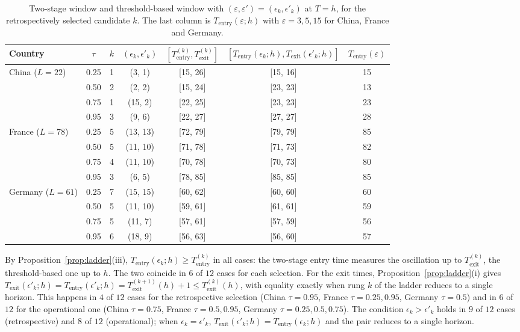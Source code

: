 \documentclass[12pt,a4paper]{article}
\begin{document}
\begin{table}[htbp]
	\centering
	\small
	\caption{Two-stage window and threshold-based window with
		$(\varepsilon,\varepsilon')=(\epsilon_k,\epsilon'_k)$ at $T=h$, for
		the retrospectively selected candidate $k$. The last column is 
		$T_{\mathrm{entry}}(\varepsilon; h)$ with
		$\varepsilon=3,5,15$ for China, France and Germany.}
	\label{tab:tentry_eps_retro}
	\begin{tabular}{lccccc c}
		\toprule
		Country & $\tau$ & $k$ & $(\epsilon_k,\epsilon'_k)$
		& $[T_{\mathrm{entry}}^{(k)},T_{\mathrm{exit}}^{(k)}]$
		& $[T_{\mathrm{entry}}(\epsilon_k;h),T_{\mathrm{exit}}(\epsilon'_k;h)]$
		& $T_{\mathrm{entry}}(\varepsilon)$ \\
		\midrule
		China ($L=22$)    & 0.25 & 1 & (3, 1)   & [15, 26] & [15, 16] & 15 \\
		& 0.50 & 2 & (2, 2)   & [15, 24] & [23, 23] & 13 \\
		& 0.75 & 1 & (15, 2)  & [22, 25] & [23, 23] & 23 \\
		& 0.95 & 3 & (9, 6)   & [22, 27] & [27, 27] & 28 \\
		\midrule
		France ($L=78$)   & 0.25 & 5 & (13, 13) & [72, 79] & [79, 79] & 85 \\
		& 0.50 & 5 & (11, 10) & [71, 78] & [71, 73] & 82 \\
		& 0.75 & 4 & (11, 10) & [70, 78] & [70, 73] & 80 \\
		& 0.95 & 3 & (6, 5)   & [78, 85] & [85, 85] & 85 \\
		\midrule
		Germany ($L=61$)  & 0.25 & 7 & (15, 15) & [60, 62] & [60, 60] & 60 \\
		& 0.50 & 5 & (11, 10) & [59, 61] & [61, 61] & 59 \\
		& 0.75 & 5 & (11, 7)  & [57, 61] & [57, 59] & 56 \\
		& 0.95 & 6 & (18, 9)  & [56, 63] & [56, 60] & 57 \\
		\bottomrule
	\end{tabular}
\end{table}

By Proposition~\ref{prop:ladder}(iii), $T_{\mathrm{entry}}(\epsilon_k;h)\ge
T_{\mathrm{entry}}^{(k)}$ in all cases: the two-stage entry time measures
the oscillation up to $T_{\mathrm{exit}}^{(k)}$, the threshold-based one up
to $h$. The two coincide in $6$ of $12$ cases for each selection. For the
exit times, Proposition~\ref{prop:ladder}(i) gives
$T_{\mathrm{exit}}(\epsilon'_k;h)=T_{\mathrm{entry}}(\epsilon'_k;h)
=T_{\mathrm{exit}}^{(k+1)}(h)+1\le T_{\mathrm{exit}}^{(k)}(h)$, with equality
exactly when rung $k$ of the ladder reduces to a single horizon. This
happens in $4$ of $12$ cases for the retrospective selection (China
$\tau=0.95$, France $\tau=0.25,0.95$, Germany $\tau=0.5$) and in $6$ of
$12$ for the operational one (China $\tau=0.75$, France $\tau=0.5,0.95$,
Germany $\tau=0.25,0.5,0.75$). The condition $\epsilon_k>\epsilon'_k$ holds
in $9$ of $12$ cases (retrospective) and $8$ of $12$ (operational); when
$\epsilon_k=\epsilon'_k$, $T_{\mathrm{exit}}(\epsilon'_k;h)=
T_{\mathrm{entry}}(\epsilon_k;h)$ and the pair reduces to a single horizon.
\end{document}
